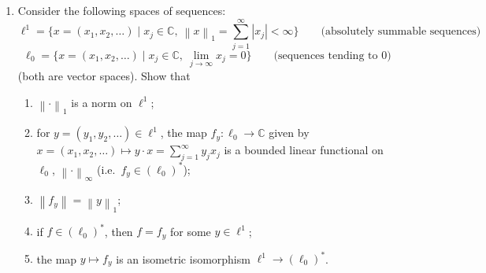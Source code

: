 \documentclass[11pt]{article}
\newcommand{\C}{\mathbb{C}}
\newcommand{\ellone}{\ell^{1}}
\newcommand{\ellzero}{\ell_{0}}
\newcommand{\norm}[1]{\left\lVert #1 \right\rVert}
\begin{document}
\begin{enumerate}[label=\arabic*., leftmargin=*, itemsep=10pt]
\item Consider the following spaces of sequences:
\[
\ellone=\{x=(x_1,x_2,\dots)\mid x_j\in\C,\ \norm{x}_1=\sum_{j=1}^{\infty}|x_j|<\infty\}\qquad\text{(absolutely summable sequences)}
\]
\[
\ellzero=\{x=(x_1,x_2,\dots)\mid x_j\in\C,\ \lim_{j\to\infty} x_j=0\}\qquad\text{(sequences tending to $0$)}
\]
(both are vector spaces). Show that
\begin{enumerate}[label=(\alph*), itemsep=4pt]
\item $\norm{\cdot}_1$ is a norm on $\ellone$;
\item for $y=(y_1,y_2,\dots)\in \ellone$, the map $f_y:\ellzero\to\C$ given by $x=(x_1,x_2,\dots)\mapsto y\cdot x=\sum_{j=1}^{\infty} y_j x_j$
is a bounded linear functional on $\ellzero$, $\norm{\cdot}_\infty$ (i.e.\ $f_y\in (\ellzero)^*$);
\item $\norm{f_y}=\norm{y}_1$;
\item if $f\in (\ellzero)^*$, then $f=f_y$ for some $y\in \ellone$;
\item the map $y\mapsto f_y$ is an isometric isomorphism $\ellone\to (\ellzero)^*$.
\end{enumerate}


\end{enumerate}
\end{document}
